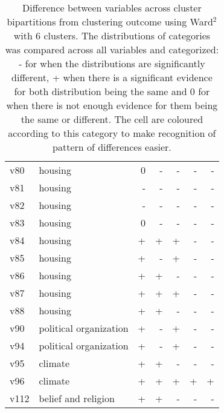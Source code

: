 \documentclass[12pt, a4paper]{article}
\begin{document}
\begin{table}
{\begin{tabular}{llrrrrr}
    v80 & housing & 0 & \cellcolor{myred} - & \cellcolor{myred} - & \cellcolor{myred} - & \cellcolor{myred} -\\
    v81 & housing & \cellcolor{myred} - & \cellcolor{myred} - & \cellcolor{myred} - & \cellcolor{myred} - & \cellcolor{myred} -\\
    v82 & housing & \cellcolor{myred} - & \cellcolor{myred} - & \cellcolor{myred} - & \cellcolor{myred} - & \cellcolor{myred} -\\
    v83 & housing & 0 & \cellcolor{myred} - & \cellcolor{myred} - & \cellcolor{myred} - & \cellcolor{myred} -\\
    v84 & housing & \cellcolor{myblue} + & \cellcolor{myblue} + & \cellcolor{myblue} + & \cellcolor{myred} - & \cellcolor{myred} -\\
    v85 & housing & \cellcolor{myblue} + & \cellcolor{myred} - & \cellcolor{myblue} + & \cellcolor{myred} - & \cellcolor{myred} -\\
    v86 & housing & \cellcolor{myblue} + & \cellcolor{myblue} + & \cellcolor{myred} - & \cellcolor{myred} - & \cellcolor{myred} -\\
    v87 & housing & \cellcolor{myblue} + & \cellcolor{myblue} + & \cellcolor{myblue} + & \cellcolor{myred} - & \cellcolor{myred} -\\
    v88 & housing & \cellcolor{myblue} + & \cellcolor{myblue} + & \cellcolor{myred} - & \cellcolor{myred} - & \cellcolor{myred} -\\
    v90 & political organization & \cellcolor{myblue} + & \cellcolor{myred} - & \cellcolor{myblue} + & \cellcolor{myred} - & \cellcolor{myred} -\\
    v94 & political organization & \cellcolor{myblue} + & \cellcolor{myred} - & \cellcolor{myblue} + & \cellcolor{myred} - & \cellcolor{myred} -\\
    v95 & climate & \cellcolor{myblue} + & \cellcolor{myblue} + & \cellcolor{myred} - & \cellcolor{myred} - & \cellcolor{myred} -\\
    v96 & climate & \cellcolor{myblue} + & \cellcolor{myblue} + & \cellcolor{myblue} + & \cellcolor{myblue} + & \cellcolor{myblue} +\\
    v112 & belief and religion & \cellcolor{myblue} + & \cellcolor{myblue} + & \cellcolor{myred} - & \cellcolor{myred} - & \cellcolor{myred} -\\
    \bottomrule
    \end{tabular}
    }
    \caption{\small Difference between variables across cluster bipartitions from clustering outcome using Ward$^2$ with 6 clusters. The distributions of categories was compared across all variables and categorized: - for when the distributions are significantly different, + when there is a significant evidence for both distribution being the same and 0 for when there is not enough evidence for them being the same or different. The cell are coloured according to this category to make recognition of pattern of differences easier.}
\end{table}
\end{document}
